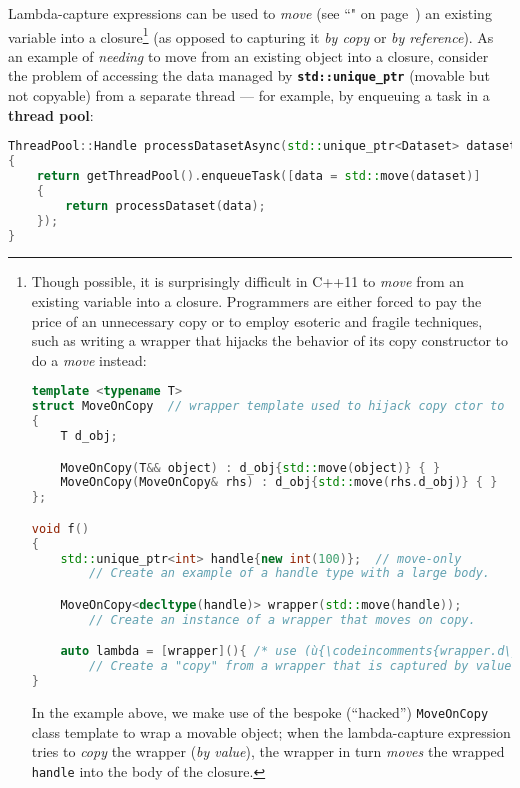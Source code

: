 Lambda-capture expressions can be used to \emph{move} (see
``" on page~\pageref{Rvalue-References}) an existing variable into a
closure{\cprotect\footnote{Though possible, it is surprisingly difficult
in C++11 to \emph{move} from an existing variable into a closure.
Programmers are either forced to pay the price of an unnecessary copy or to employ esoteric and fragile techniques, such as writing a wrapper
that hijacks the behavior of its copy constructor to do a \emph{move}
instead:

\begin{lstlisting}[language=C++, basicstyle={\ttfamily\footnotesize}]
template <typename T>
struct MoveOnCopy  // wrapper template used to hijack copy ctor to do move
{
    T d_obj;

    MoveOnCopy(T&& object) : d_obj{std::move(object)} { }
    MoveOnCopy(MoveOnCopy& rhs) : d_obj{std::move(rhs.d_obj)} { }
};

void f()
{
    std::unique_ptr<int> handle{new int(100)};  // move-only
        // Create an example of a handle type with a large body.

    MoveOnCopy<decltype(handle)> wrapper(std::move(handle));
        // Create an instance of a wrapper that moves on copy.

    auto lambda = [wrapper](){ /* use (ù{\codeincomments{wrapper.d\_obj}}ù) */ };
        // Create a "copy" from a wrapper that is captured by value.
}
\end{lstlisting}

\noindent In the example above, we make use of the bespoke (``hacked'')
\texttt{MoveOnCopy} class template to wrap a movable object;
when the lambda-capture expression tries to \emph{copy} the wrapper (\textit{by value}),
the wrapper in turn \emph{moves} the wrapped
  \texttt{handle} into the body of the closure.}} (as opposed to
capturing it \emph{by copy} or \emph{by reference}). As an example of
\emph{needing} to move from an existing object into a closure, consider
the problem of accessing the data managed by
\textbf{\texttt{std::unique\_ptr}} (movable but not copyable) from a
separate thread --- for example, by enqueuing a task in a \textbf{thread
pool}:

\begin{lstlisting}[language=C++]
ThreadPool::Handle processDatasetAsync(std::unique_ptr<Dataset> dataset)
{
    return getThreadPool().enqueueTask([data = std::move(dataset)]
    {
        return processDataset(data);
    });
}
\end{lstlisting}

